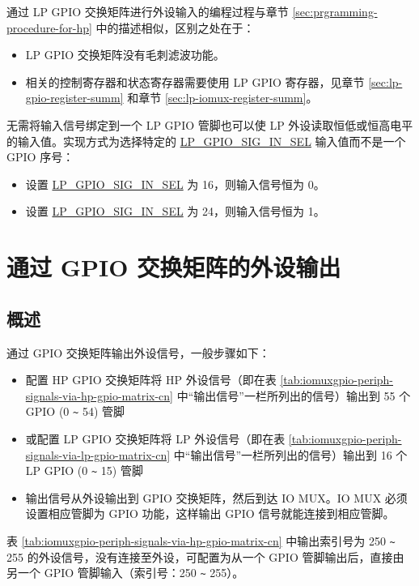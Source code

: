 \documentclass[main\_\_CN.tex]{subfiles}
\begin{document}
通过 LP GPIO 交换矩阵进行外设输入的编程过程与章节 \ref{sec:prgramming-procedure-for-hp} 中的描述相似，区别之处在于：
\begin{itemize}
    \item LP GPIO 交换矩阵没有毛刺滤波功能。
    \item 相关的控制寄存器和状态寄存器需要使用 LP GPIO 寄存器，见章节 \ref{sec:lp-gpio-register-summ} 和章节 \ref{sec:lp-iomux-register-summ}。
\end{itemize}
\begin{tiplisting}
无需将输入信号绑定到一个 LP GPIO 管脚也可以使 LP 外设读取恒低或恒高电平的输入值。实现方式为选择特定的 \hyperref[fielddesc:LPGPIOSIGNINSEL]{LP\_GPIO\_SIG\_IN\_SEL} 输入值而不是一个 GPIO 序号：
\begin {itemize}
\item 设置 \hyperref[fielddesc:LPGPIOSIGNINSEL]{LP\_GPIO\_SIG\_IN\_SEL} 为 16，则输入信号恒为 0。
\item 设置 \hyperref[fielddesc:LPGPIOSIGNINSEL]{LP\_GPIO\_SIG\_IN\_SEL} 为 24，则输入信号恒为 1。
\end{itemize}
\end{tiplisting}

\section{通过 GPIO 交换矩阵的外设输出}
\label{sec:peripheral-output-via-gpio-matrix}

\subsection{概述}

通过 GPIO 交换矩阵输出外设信号，一般步骤如下：
\begin{itemize}
    \item 配置 HP GPIO 交换矩阵将 HP 外设信号（即在表 \ref{tab:iomuxgpio-periph-signals-via-hp-gpio-matrix-cn} 中``输出信号”一栏所列出的信号）输出到 55 个 GPIO (0 \verb+~+ 54) 管脚
    \item 或配置 LP GPIO 交换矩阵将 LP 外设信号（即在表 \ref{tab:iomuxgpio-periph-signals-via-lp-gpio-matrix-cn} 中``输出信号”一栏所列出的信号）输出到 16 个 LP GPIO (0 \verb+~+ 15) 管脚
    \item 输出信号从外设输出到 GPIO 交换矩阵，然后到达 IO MUX。IO MUX 必须设置相应管脚为 GPIO 功能，这样输出 GPIO 信号就能连接到相应管脚。
\end{itemize}
\begin{tiplisting}
表 \ref{tab:iomuxgpio-periph-signals-via-hp-gpio-matrix-cn} 中输出索引号为 250 \verb+~+ 255 的外设信号，没有连接至外设，可配置为从一个 GPIO 管脚输出后，直接由另一个 GPIO 管脚输入（索引号：250 \verb+~+ 255）。
\end{tiplisting}
\vspace{-2em}
\end{document}
